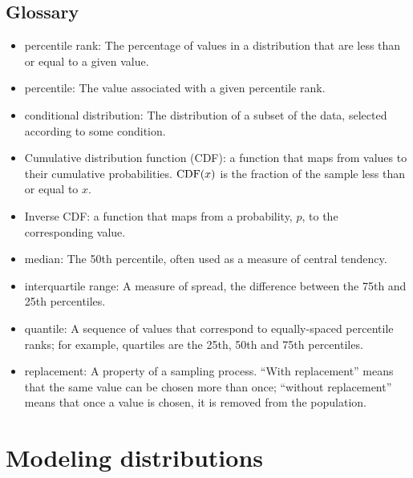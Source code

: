 \documentclass[12pt]{book}
\begin{document}
\section{Glossary}

\begin{itemize}

\item percentile rank: The percentage of values in a distribution that are
less than or equal to a given value.

\item percentile: The value associated with a given percentile rank.

\item conditional distribution: The distribution of a subset of
the data, selected according to some condition.

\item Cumulative distribution function (CDF): a function that maps
  from values to their cumulative probabilities.  $\mathrm{CDF}(x)$ is the
  fraction of the sample less than or equal to $x$.  

\item Inverse CDF: a function that maps from a probability, $p$, to
  the corresponding value.

\item median: The 50th percentile, often used as a measure of central
  tendency.  

\item interquartile range: A measure of spread, the difference between
the 75th and 25th percentiles.

\item quantile: A sequence of values that correspond to equally-spaced
percentile ranks; for example, quartiles are
the 25th, 50th and 75th percentiles.

\item replacement: A property of a sampling process. ``With replacement''
means that the same value can be chosen more than once; ``without
replacement'' means that once a value is chosen, it is removed from
the population.

\end{itemize}


\chapter{Modeling distributions}
\label{analytic}
\end{document}
